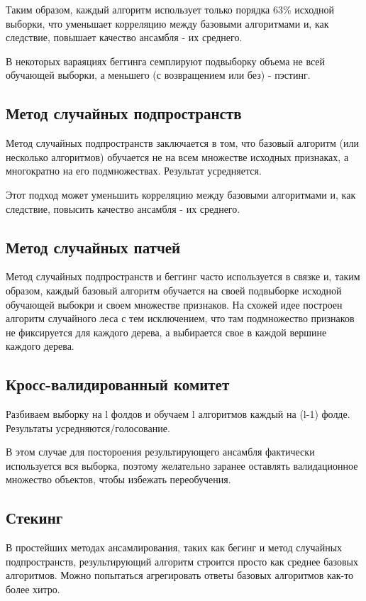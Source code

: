 Таким образом, каждый алгоритм использует только порядка 63\% исходной выборки, что уменьшает корреляцию между базовыми алгоритмами и, как следствие, повышает качество ансамбля - их среднего.

В некоторых вараяциях беггинга семплируют подвыборку объема не всей обучающей выборки, а меньшего (с возвращением или без) - пэстинг.  

\subsection{Метод случайных подпространств}

Метод случайных подпространств заключается в том, что базовый алгоритм (или несколько алгоритмов) обучается не на всем множестве исходных признаках, а многократно на его подмножествах. Результат усредняется.

Этот подход может уменьшить корреляцию между базовыми алгоритмами и, как следствие, повысить качество ансамбля - их среднего.

\subsection{Метод случайных патчей}

Метод случайных подпространств и беггинг часто используется в связке и, таким образом, каждый базовый алгоритм обучается на своей подвыборке исходной обучающей выбокри и своем множестве признаков. На схожей идее построен алгоритм случайного леса с тем исключением, что там подмножество признаков не фиксируется для каждого дерева, а выбирается свое в каждой вершине каждого дерева.

\subsection{Кросс-валидированный комитет}

Разбиваем выборку на l фолдов и обучаем l алгоритмов каждый на (l-1) фолде. Результаты усредняются/голосование.

В этом случае для постороения результирующего ансамбля фактически используется вся выборка, поэтому желательно заранее оставлять валидационное множество объектов, чтобы избежать переобучения. 

\subsection{Стекинг}

В простейших методах ансамлирования, таких как бегинг и метод случайных подпространств, результирующий алгоритм строится просто как среднее базовых алгоритмов. Можно попытаться агрегировать ответы базовых алгоритмов как-то более хитро. 

